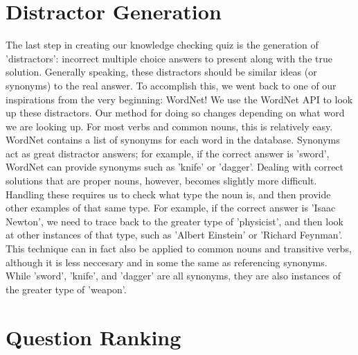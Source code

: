 \documentclass[finalcopy]{srpaper}
\begin{document}
%
%
\chapter{Distractor Generation}
\label{Chapter:Distractor Generation}

The last step in creating our knowledge checking quiz is the generation of 'distractors': incorrect multiple choice answers to present along with the true solution. Generally speaking, these distractors should be similar ideas (or synonyms) to the real answer. To accomplish this, we went back to one of our inspirations from the very beginning: WordNet!
\newline
We use the WordNet API to look up these distractors. Our method for doing so changes depending on what word we are looking up. For most verbs and common nouns, this is relatively easy. WordNet contains a list of synonyms for each word in the database. Synonyms act as great distractor answers; for example, if the correct answer is 'sword', WordNet can provide synonyms such as 'knife' or 'dagger'.
\newline
Dealing with correct solutions that are proper nouns, however, becomes slightly more difficult. Handling these requires us to check what type the noun is, and then provide other examples of that same type. For example, if the correct answer is 'Isaac Newton', we need to trace back to the greater type of 'physicist', and then look at other instances of that type, such as 'Albert Einstein' or 'Richard Feynman'. This technique can in fact also be applied to common nouns and transitive verbs, although it is less neccesary and in some the same as referencing synonyms. While 'sword', 'knife', and 'dagger' are all synonyms, they are also instances of the greater type of 'weapon'.


%
%
\chapter{Question Ranking}
\label{Chapter:Question Ranking}
\end{document}

